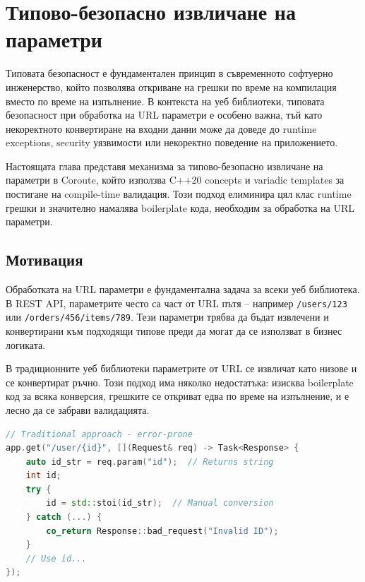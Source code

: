 \section{Типово-безопасно извличане на параметри}
\label{sec:type_safe_params}

Типовата безопасност е фундаментален принцип в съвременното софтуерно инженерство, който позволява откриване на грешки по време на компилация вместо по време на изпълнение. В контекста на уеб библиотеки, типовата безопасност при обработка на URL параметри е особено важна, тъй като некоректното конвертиране на входни данни може да доведе до runtime exceptions, security уязвимости или некоректно поведение на приложението.

Настоящата глава представя механизма за типово-безопасно извличане на параметри в Coroute, който използва C++20 concepts и variadic templates за постигане на compile-time валидация. Този подход елиминира цял клас runtime грешки и значително намалява boilerplate кода, необходим за обработка на URL параметри.

\subsection{Мотивация}

Обработката на URL параметри е фундаментална задача за всеки уеб библиотека. В REST API, параметрите често са част от URL пътя -- например \texttt{/users/123} или \texttt{/orders/456/items/789}. Тези параметри трябва да бъдат извлечени и конвертирани към подходящи типове преди да могат да се използват в бизнес логиката.

В традиционните уеб библиотеки параметрите от URL се извличат като низове и се конвертират ръчно. Този подход има няколко недостатъка: изисква boilerplate код за всяка конверсия, грешките се откриват едва по време на изпълнение, и е лесно да се забрави валидацията.

\begin{lstlisting}[language=C++, basicstyle=\small\ttfamily, caption={Традиционен подход}]
// Traditional approach - error-prone
app.get("/user/{id}", [](Request& req) -> Task<Response> {
    auto id_str = req.param("id");  // Returns string
    int id;
    try {
        id = std::stoi(id_str);  // Manual conversion
    } catch (...) {
        co_return Response::bad_request("Invalid ID");
    }
    // Use id...
});
\end{lstlisting}

